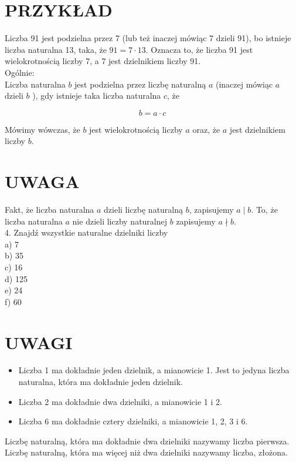\documentclass[10pt]{article}
\begin{document}
\section*{PRZYKŁAD}
Liczba 91 jest podzielna przez 7 (lub też inaczej mówiąc 7 dzieli 91), bo istnieje liczba naturalna 13, taka, że \(91=7 \cdot 13\). Oznacza to, że liczba 91 jest wielokrotnością liczby 7, a 7 jest dzielnikiem liczby 91.\\
Ogólnie:\\
Liczba naturalna \(b\) jest podzielna przez liczbę naturalną \(a\) (inaczej mówiąc \(a\) dzieli \(b\) ), gdy istnieje taka liczba naturalna \(c\), że

\[
b=a \cdot c
\]

Mówimy wówczas, że \(b\) jest wielokrotnością liczby \(a\) oraz, że \(a\) jest dzielnikiem liczby \(b\).

\section*{UWAGA}
Fakt, że liczba naturalna \(a\) dzieli liczbę naturalną \(b\), zapisujemy \(a \mid b\). To, że liczba naturalna \(a\) nie dzieli liczby naturalnej \(b\) zapisujemy \(a \nmid b\).\\
4. Znajdź wszystkie naturalne dzielniki liczby\\
a) 7\\
b) 35\\
c) 16\\
d) 125\\
e) 24\\
f) 60

\section*{UWAGI}
\begin{itemize}
  \item Liczba 1 ma dokładnie jeden dzielnik, a mianowicie 1. Jest to jedyna liczba naturalna, która ma dokładnie jeden dzielnik.
  \item Liczba 2 ma dokładnie dwa dzielniki, a mianowicie 1 i 2.
  \item Liczba 6 ma dokładnie cztery dzielniki, a mianowicie 1, 2, 3 i 6.
\end{itemize}

Liczbę naturalną, która ma dokładnie dwa dzielniki nazywamy liczba pierwsza.\\
Liczbę naturalną, która ma więcej niż dwa dzielniki nazywamy liczba, złożona.
\end{document}
